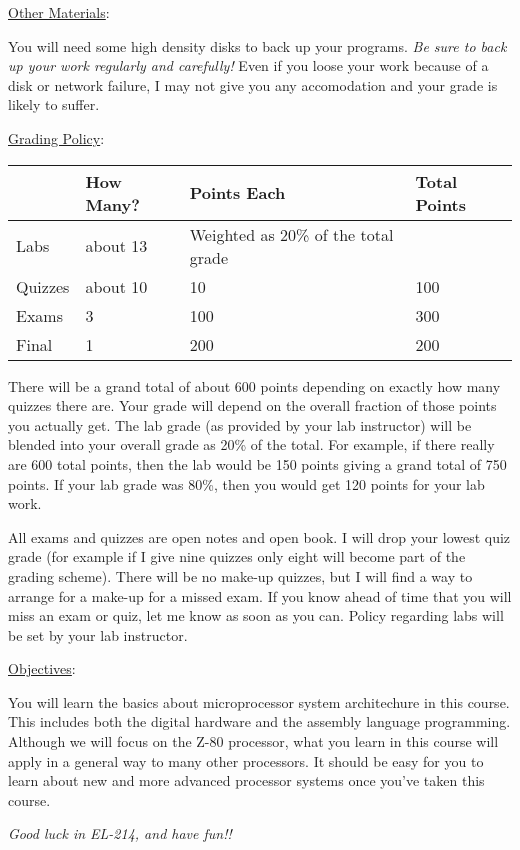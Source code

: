 \underline{Other Materials}:

You will need some high density disks to back up your programs. {\em Be
sure to back up your work regularly and carefully!} Even if you loose your
work because of a disk or network failure, I may not give you any
accomodation and your grade is likely to suffer.

\underline{Grading Policy}:

\begin{tabular}{|l|l|l|l|} \hline
         & How Many? & Points Each & Total Points            \\ \hline \hline
Labs     & about 13  & Weighted as 20\% of the total grade & \\ \hline
Quizzes  & about 10  & 10          & 100                     \\ \hline
Exams    & 3         & 100         & 300                     \\ \hline
Final    & 1         & 200         & 200                     \\ \hline
\end{tabular}

There will be a grand total of about 600 points depending on exactly how
many quizzes there are. Your grade will depend on the overall fraction of
those points you actually get. The lab grade (as provided by your lab
instructor) will be blended into your overall grade as 20\% of the total.
For example, if there really are 600 total points, then the lab would be
150 points giving a grand total of 750 points. If your lab grade was 80\%,
then you would get 120 points for your lab work.

All exams and quizzes are open notes and open book. I will drop your lowest
quiz grade (for example if I give nine quizzes only eight will become part
of the grading scheme). There will be no make-up quizzes, but I will find a
way to arrange for a make-up for a missed exam. If you know ahead of time
that you will miss an exam or quiz, let me know as soon as you can. Policy
regarding labs will be set by your lab instructor.

\underline{Objectives}:

You will learn the basics about microprocessor system architechure in this
course. This includes both the digital hardware and the assembly language
programming. Although we will focus on the Z-80 processor, what you learn
in this course will apply in a general way to many other processors. It
should be easy for you to learn about new and more advanced processor
systems once you've taken this course.

{\em Good luck in EL-214, and have fun!!}


